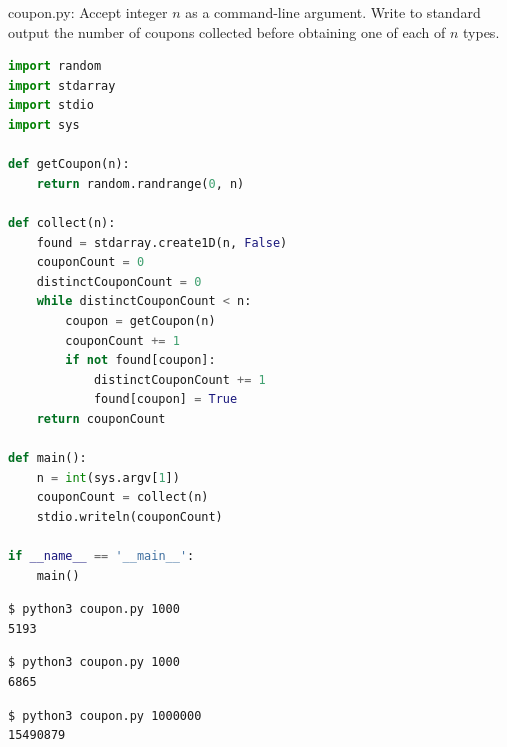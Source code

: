 \documentclass[8pt,a4paper,compress]{beamer}
\begin{document}
\begin{frame}[fragile]
\pause

\begin{framed}
\tiny coupon.py: Accept integer $n$ as a command-line argument. Write to standard output the number of coupons collected before obtaining one of each of $n$ types.
\end{framed}

\begin{lstlisting}[language=Python]
import random
import stdarray
import stdio
import sys

def getCoupon(n):
    return random.randrange(0, n)

def collect(n):
    found = stdarray.create1D(n, False)
    couponCount = 0
    distinctCouponCount = 0
    while distinctCouponCount < n:
        coupon = getCoupon(n)
        couponCount += 1
        if not found[coupon]:
            distinctCouponCount += 1
            found[coupon] = True
    return couponCount

def main():
    n = int(sys.argv[1])
    couponCount = collect(n)
    stdio.writeln(couponCount)

if __name__ == '__main__':
    main()
\end{lstlisting}
\end{frame}

\begin{frame}[fragile]
\pause

\begin{lstlisting}[language={}]
$ python3 coupon.py 1000
5193
\end{lstlisting}

\pause

\begin{lstlisting}[language={}]
$ python3 coupon.py 1000
6865
\end{lstlisting}

\pause

\begin{lstlisting}[language={}]
$ python3 coupon.py 1000000
15490879
\end{lstlisting}
\end{frame}
\end{document}
